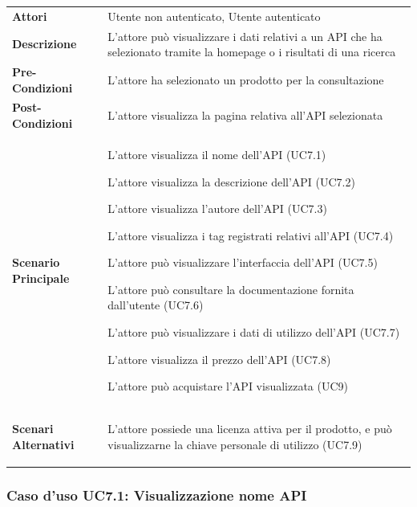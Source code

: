 \begin{longtable}{ l | p{11cm}}
	\hline
	\rowcolor{Gray}
	\multicolumn{2}{c}{UC7 - Visualizzazione API}\\
	\hline
	
	 \textbf{Attori} & Utente non autenticato, Utente autenticato  \\
	\textbf{Descrizione} & L'attore può visualizzare i dati relativi a un API che ha selezionato tramite la homepage o i risultati di una ricerca  \\
	\textbf{Pre-Condizioni} & L'attore ha selezionato un prodotto per la consultazione \\
	\textbf{Post-Condizioni} & L'attore visualizza la pagina relativa all'API selezionata\\
	\textbf{Scenario Principale} & 
	\begin{enumerate*}[label=(\arabic*.),itemjoin={\newline}]
		\item L'attore visualizza il nome dell'API (UC7.1)
		\item L'attore visualizza la descrizione dell'API (UC7.2)
		\item L'attore visualizza l'autore dell'API (UC7.3)
		\item L'attore visualizza i tag registrati relativi all'API (UC7.4)
		\item L'attore può visualizzare l'interfaccia dell'API (UC7.5)
		\item L'attore può consultare la documentazione fornita dall'utente (UC7.6)
		\item L'attore può visualizzare i dati di utilizzo dell'API  (UC7.7)
		\item L'attore visualizza il prezzo dell'API (UC7.8)
		\item L'attore può acquistare l'API visualizzata (UC9)
	\end{enumerate*}\\
	\textbf{Scenari Alternativi} & 
	\begin{enumerate*}[label=(\arabic*.),itemjoin={\newline}]
		\item L'attore possiede una licenza attiva per il prodotto, e può visualizzarne la chiave personale di utilizzo (UC7.9)
	\end{enumerate*}\\
\end{longtable}


\subsubsection{Caso d'uso UC7.1: Visualizzazione nome API}
\label{UC7_1}

